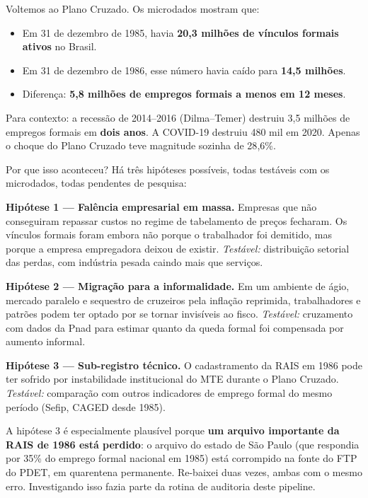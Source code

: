 \documentclass[12pt,a4paper,oneside]{article}
\begin{document}
Voltemos ao Plano Cruzado. Os microdados mostram que:

\begin{itemize}
  \item Em 31 de dezembro de 1985, havia \textbf{20{,}3 milhões de
        vínculos formais ativos} no Brasil.
  \item Em 31 de dezembro de 1986, esse número havia caído para
        \textbf{14{,}5 milhões}.
  \item Diferença: \textbf{5{,}8 milhões de empregos formais a menos em
        12 meses}.
\end{itemize}

Para contexto: a recessão de 2014--2016 (Dilma--Temer) destruiu 3{,}5
milhões de empregos formais em \textbf{dois anos}. A COVID-19 destruiu
480 mil em 2020. Apenas o choque do Plano Cruzado teve magnitude
sozinha de 28{,}6\%.

Por que isso aconteceu? Há três hipóteses possíveis, todas testáveis com
os microdados, todas pendentes de pesquisa:

\textbf{Hipótese 1 --- Falência empresarial em massa.} Empresas que não
conseguiram repassar custos no regime de tabelamento de preços fecharam.
Os vínculos formais foram embora não porque o trabalhador foi demitido,
mas porque a empresa empregadora deixou de existir. \textit{Testável:}
distribuição setorial das perdas, com indústria pesada caindo mais que
serviços.

\textbf{Hipótese 2 --- Migração para a informalidade.} Em um ambiente de
ágio, mercado paralelo e sequestro de cruzeiros pela inflação reprimida,
trabalhadores e patrões podem ter optado por se tornar invisíveis ao
fisco. \textit{Testável:} cruzamento com dados da Pnad para estimar
quanto da queda formal foi compensada por aumento informal.

\textbf{Hipótese 3 --- Sub-registro técnico.} O cadastramento da RAIS em
1986 pode ter sofrido por instabilidade institucional do MTE durante o
Plano Cruzado. \textit{Testável:} comparação com outros indicadores de
emprego formal do mesmo período (Sefip, CAGED desde 1985).

A hipótese 3 é especialmente plausível porque \textbf{um arquivo importante
da RAIS de 1986 está perdido}: o arquivo do estado de São Paulo (que
respondia por 35\% do emprego formal nacional em 1985) está corrompido na
fonte do FTP do PDET, em quarentena permanente. Re-baixei duas vezes,
ambas com o mesmo erro. Investigando isso fazia parte da rotina de
auditoria deste pipeline.
\end{document}
